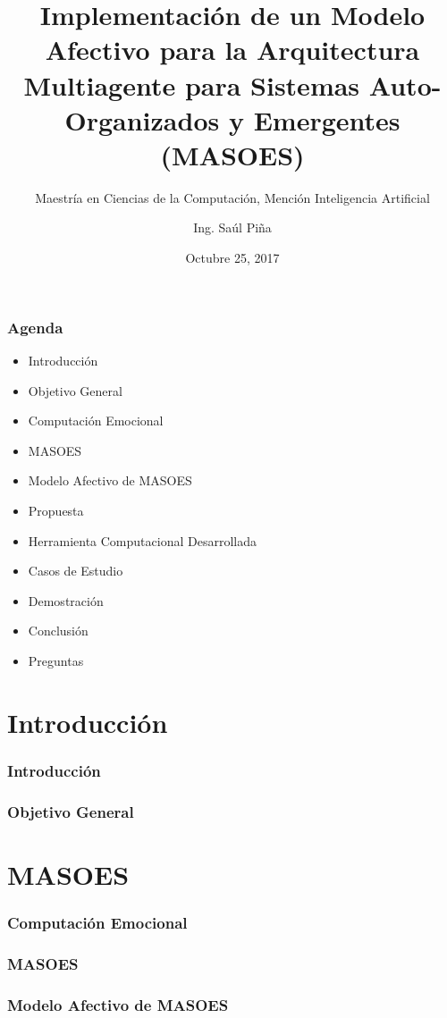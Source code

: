 \documentclass{beamer}
\title{Implementación de un Modelo Afectivo para la Arquitectura Multiagente para Sistemas Auto-Organizados y Emergentes (MASOES)}
\subtitle{Maestría en Ciencias de la Computación, Mención Inteligencia Artificial}
\author{Ing. Saúl Piña}
\date{Octubre 25, 2017}
\institute{\url{sauljabin@gmail.com}}
\begin{document}
\begin{frame}[plain,t]
\titlepage
\end{frame}

\begin{frame}
\frametitle{Agenda}
\begin{itemize}
\item Introducción
\item Objetivo General
\item Computación Emocional
\item MASOES
\item Modelo Afectivo de MASOES
\item Propuesta
\item Herramienta Computacional Desarrollada
\item Casos de Estudio
\item Demostración
\item Conclusión
\item Preguntas
\end{itemize}
\end{frame}

\section{Introducción}

\begin{frame}
\frametitle{Introducción}

\end{frame}

\begin{frame}
\frametitle{Objetivo General}

\end{frame}

\section{MASOES}

\begin{frame}
\frametitle{Computación Emocional}

\end{frame}

\begin{frame}
\frametitle{MASOES}

\end{frame}

\begin{frame}
\frametitle{Modelo Afectivo de MASOES}

\end{frame}
\end{document}
